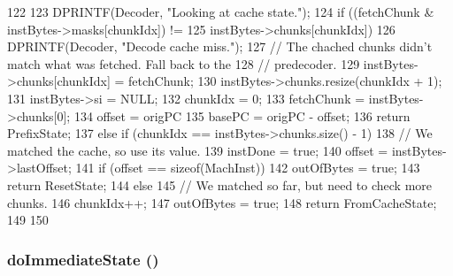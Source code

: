 \begin{DoxyCode}
122 {
123     DPRINTF(Decoder, "Looking at cache state.\n");
124     if ((fetchChunk & instBytes->masks[chunkIdx]) !=
125             instBytes->chunks[chunkIdx]) {
126         DPRINTF(Decoder, "Decode cache miss.\n");
127         // The chached chunks didn't match what was fetched. Fall back to the
128         // predecoder.
129         instBytes->chunks[chunkIdx] = fetchChunk;
130         instBytes->chunks.resize(chunkIdx + 1);
131         instBytes->si = NULL;
132         chunkIdx = 0;
133         fetchChunk = instBytes->chunks[0];
134         offset = origPC %
135         basePC = origPC - offset;
136         return PrefixState;
137     } else if (chunkIdx == instBytes->chunks.size() - 1) {
138         // We matched the cache, so use its value.
139         instDone = true;
140         offset = instBytes->lastOffset;
141         if (offset == sizeof(MachInst))
142             outOfBytes = true;
143         return ResetState;
144     } else {
145         // We matched so far, but need to check more chunks.
146         chunkIdx++;
147         outOfBytes = true;
148         return FromCacheState;
149     }
150 }
\end{DoxyCode}
\hypertarget{classX86ISA_1_1Decoder_ad402df3f8c4d1f4fb2b7a29d72ba00ec}{
\subsubsection[{doImmediateState}]{ doImmediateState ()}}
\label{classX86ISA_1_1Decoder_ad402df3f8c4d1f4fb2b7a29d72ba00ec}



